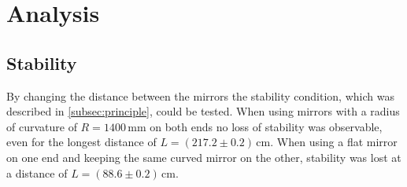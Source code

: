 \section{Analysis} %
\label{sec:analysis}

\subsection{Stability}
By changing the distance between the mirrors the stability condition, 
which was described in \autoref{subsec:principle}, could be tested.
When using mirrors with a radius of curvature of $R=1400\,\unit{\mm}$ on both ends no loss of stability was observable, even for the 
longest distance of $L=(217.2\pm0.2)\,\unit{\cm}$. 
When using a flat mirror on one end and keeping the same curved mirror on the other, 
stability was lost at a distance of $L=(88.6\pm0.2)\,\unit{\cm}$.

